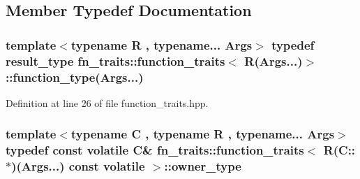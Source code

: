 \subsection{Member Typedef Documentation}
\subsubsection[{\texorpdfstring{function\+\_\+type}{function_type}}]{\setlength{\rightskip}{0pt plus 5cm}template$<$typename R , typename... Args$>$ typedef {\bf result\+\_\+type} {\bf fn\+\_\+traits\+::function\+\_\+traits}$<$ R(Args...)$>$\+::function\+\_\+type(Args...)\hspace{0.3cm}{\ttfamily [inherited]}}\hypertarget{structfn__traits_1_1function__traits_3_01_r_07_args_8_8_8_08_4_a85e5883a1c8050fe442c1072386b2d11}{}\label{structfn__traits_1_1function__traits_3_01_r_07_args_8_8_8_08_4_a85e5883a1c8050fe442c1072386b2d11}


Definition at line 26 of file function\+\_\+traits.\+hpp.

\subsubsection[{\texorpdfstring{owner\+\_\+type}{owner_type}}]{\setlength{\rightskip}{0pt plus 5cm}template$<$typename C , typename R , typename... Args$>$ typedef const volatile C\& {\bf fn\+\_\+traits\+::function\+\_\+traits}$<$ R(C\+::$\ast$)(Args...) const volatile $>$\+::{\bf owner\+\_\+type}}\hypertarget{structfn__traits_1_1function__traits_3_01_r_07_c_1_1_5_08_07_args_8_8_8_08_01const_01volatile_01_4_ac9e0f1043d2bd54c554f14e2a05dfa0c}{}\label{structfn__traits_1_1function__traits_3_01_r_07_c_1_1_5_08_07_args_8_8_8_08_01const_01volatile_01_4_ac9e0f1043d2bd54c554f14e2a05dfa0c}


